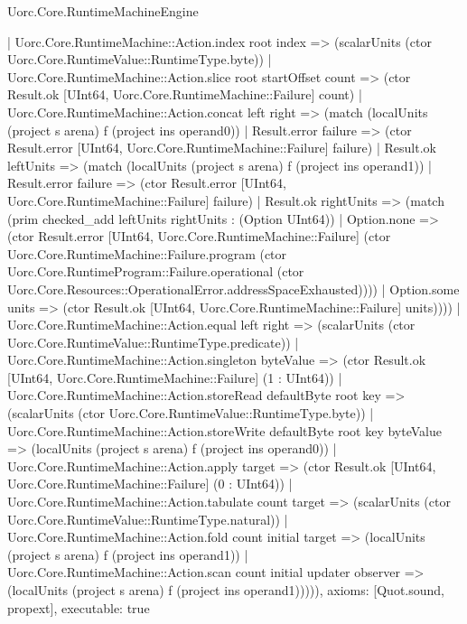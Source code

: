 \begin{lexlean}{Uorc.Core.RuntimeMachineEngine}
\begin{semanticmodule}
{        | Uorc.Core.RuntimeMachine::Action.index root index => (scalarUnits (ctor Uorc.Core.RuntimeValue::RuntimeType.byte))
        | Uorc.Core.RuntimeMachine::Action.slice root startOffset count => (ctor Result.ok [UInt64, Uorc.Core.RuntimeMachine::Failure] count)
        | Uorc.Core.RuntimeMachine::Action.concat left right => (match (localUnits (project s arena) f (project ins operand0))
          | Result.error failure => (ctor Result.error [UInt64, Uorc.Core.RuntimeMachine::Failure] failure)
          | Result.ok leftUnits => (match (localUnits (project s arena) f (project ins operand1))
            | Result.error failure => (ctor Result.error [UInt64, Uorc.Core.RuntimeMachine::Failure] failure)
            | Result.ok rightUnits => (match (prim checked_add leftUnits rightUnits : (Option UInt64))
              | Option.none => (ctor Result.error [UInt64, Uorc.Core.RuntimeMachine::Failure] (ctor Uorc.Core.RuntimeMachine::Failure.program (ctor Uorc.Core.RuntimeProgram::Failure.operational (ctor Uorc.Core.Resources::OperationalError.addressSpaceExhausted))))
              | Option.some units => (ctor Result.ok [UInt64, Uorc.Core.RuntimeMachine::Failure] units))))
        | Uorc.Core.RuntimeMachine::Action.equal left right => (scalarUnits (ctor Uorc.Core.RuntimeValue::RuntimeType.predicate))
        | Uorc.Core.RuntimeMachine::Action.singleton byteValue => (ctor Result.ok [UInt64, Uorc.Core.RuntimeMachine::Failure] (1 : UInt64))
        | Uorc.Core.RuntimeMachine::Action.storeRead defaultByte root key => (scalarUnits (ctor Uorc.Core.RuntimeValue::RuntimeType.byte))
        | Uorc.Core.RuntimeMachine::Action.storeWrite defaultByte root key byteValue => (localUnits (project s arena) f (project ins operand0))
        | Uorc.Core.RuntimeMachine::Action.apply target => (ctor Result.ok [UInt64, Uorc.Core.RuntimeMachine::Failure] (0 : UInt64))
        | Uorc.Core.RuntimeMachine::Action.tabulate count target => (scalarUnits (ctor Uorc.Core.RuntimeValue::RuntimeType.natural))
        | Uorc.Core.RuntimeMachine::Action.fold count initial target => (localUnits (project s arena) f (project ins operand1))
        | Uorc.Core.RuntimeMachine::Action.scan count initial updater observer => (localUnits (project s arena) f (project ins operand1))))),
  axioms: [Quot.sound, propext],
  executable: true
}


\end{semanticmodule}
\end{lexlean}
